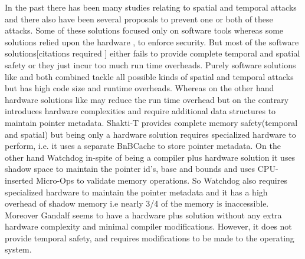 In the past there has been many studies relating to spatial and temporal attacks \cite{BaggyBounds, Valgrind,CCured,SoftBound,Mudflap,BackwardChecking,LLP,DFI,DieHard,Austin,CETS,Fischer,ComprehesiveMemsafety,Watchdog,Hardbound,AccMetaDataChecks,IGPM} and there also have been several proposals to prevent one or both of these attacks. Some of these solutions focused only on software tools \cite{BaggyBounds, Valgrind,CCured,SoftBound,Mudflap,BackwardChecking,LLP,DFI,DieHard,Austin,CETS} whereas some solutions relied upon the hardware \cite{Fischer,ComprehesiveMemsafety,Watchdog,Hardbound,AccMetaDataChecks,IGPM}, to enforce security. But most of the software solutions[citations required ] either fails to provide complete temporal and spatial safety or they just incur too much run time overheads. Purely software solutions like \cite{SoftBound} and \cite{CETS} both combined tackle all possible kinds of spatial and temporal attacks but has high code size and runtime overheads. Whereas on the other hand hardware solutions like \cite{Shakti-T,Watchdog} may reduce the run time overhead but on the contrary introduces hardware complexities and require additional data structures to maintain pointer metadata. Shakti-T\cite{Shakti-T} provides complete memory safety(temporal and spatial) but being only a hardware solution requires specialized hardware to perform, i.e. it uses a separate BnBCache to store pointer metadata. On the other hand Watchdog\cite{Watchdog} in-spite of being a compiler plus hardware solution it uses shadow space to maintain the pointer id's, base and bounds and uses CPU-inserted Micro-Ops to validate memory operations. So Watchdog also requires  specialized hardware to maintain the pointer metadata and it has a high overhead of shadow memory i.e nearly 3/4 of the memory is inaccessible. Moreover Gandalf\cite{Gandlaf} seems to have a hardware plus solution without any extra hardware complexity and minimal compiler modifications. However, it does not provide temporal safety, and requires modifications to be made to the operating system.\\

